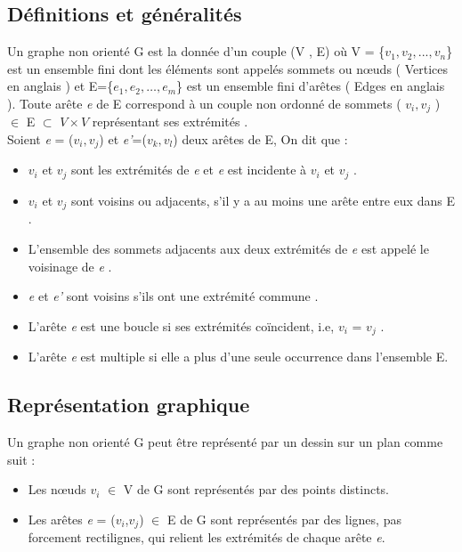 	\subsection{Définitions et généralités}
		
Un graphe non orienté G est la donnée d’un couple (V , E) où V = \{$ \textit{v}_{1} , \textit{v}_{2} ,..., \textit{v}_{n} $\} est un ensemble fini dont les éléments sont appelés sommets ou nœuds ( Vertices en anglais ) et  E=\{$\textit{e}_{1} ,  \textit{e}_{2} ,…, \textit{e}_{m} $\} est un ensemble fini d'arêtes ( Edges en anglais ). Toute arête \textit{e} de E correspond à un couple non ordonné de sommets ( $\textit{v}_{i} , \textit{v}_{j}$ ) $\in$ E $\subset$  $V \times V$ représentant ses extrémités \citep{muller} \citep{fages2014exploitation}.
\\Soient \textit{e} = ($\textit{v}_{i} , \textit{v}_{j}$) et \textit{e'}=($\textit{v}_{k} , \textit{v}_{l}$) deux arêtes de E, On dit que :
\begin{itemize}
\item $\textit{v}_{i}$ et $\textit{v}_{j}$ sont les extrémités de \textit{e} et \textit{e} est incidente à $\textit{v}_{i}$ et $\textit{v}_{j}$ \citep{hennecart2012elements}.
\item $\textit{v}_{i}$ et $\textit{v}_{j}$ sont voisins ou adjacents, s'il y a au moins une arête entre eux dans E \citep{IUTLyonInformatique}.
\item L'ensemble des sommets adjacents aux deux extrémités de \textit{e} est appelé le voisinage de \textit{e} \citep{muller}. 
\item \textit{e} et \textit{e'} sont voisins s'ils ont une extrémité commune  \citep{lopez2003cours}.
\item L'arête \textit{e} est une boucle si ses extrémités coïncident, i.e, $\textit{v}_{i}$ = $\textit{v}_{j}$ \citep{IUTLyonInformatique}. 
\item L'arête \textit{e} est multiple si elle a plus d'une seule occurrence dans l'ensemble E.
\end{itemize}	
		 
\subsection{Représentation graphique}
Un graphe non orienté G peut être représenté par un dessin sur un plan comme suit \citep{muller}:

\begin{itemize}
\item Les nœuds $\textit{v}_{i}$ $\in$ V de G sont représentés par des points distincts.
\item 	Les arêtes \textit{e} = ($\textit{v}_{i}$,$\textit{v}_{j}$) $\in$ E de G sont représentés par des lignes, pas forcement rectilignes, qui relient les extrémités de chaque arête \textit{e}.
\end{itemize}

